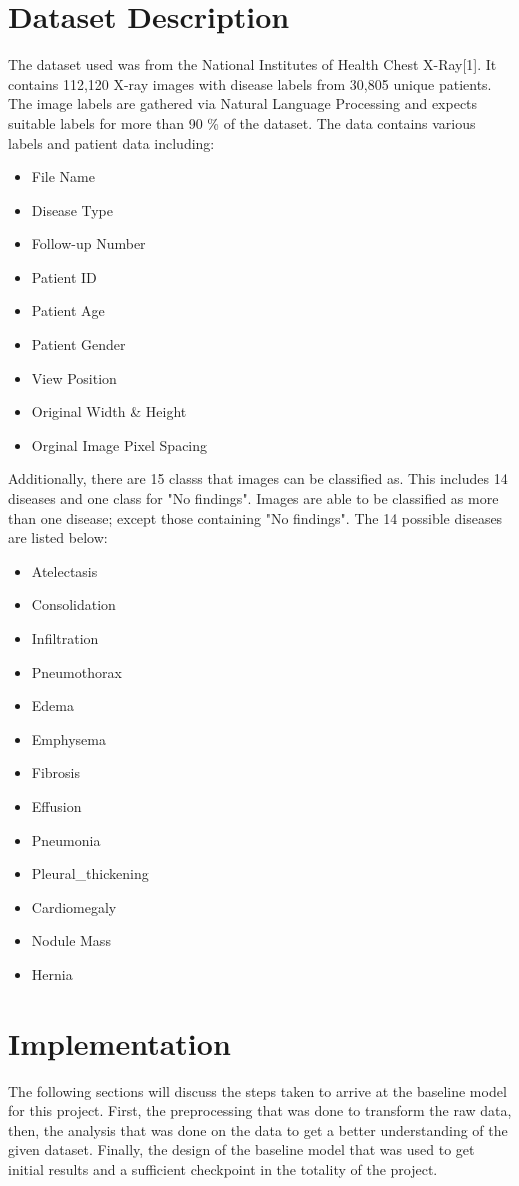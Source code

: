 \documentclass{article}
\begin{document}
\section{Dataset Description}
The dataset used was from the National Institutes of Health Chest X-Ray[1]. It contains 112,120 X-ray images with disease labels from 30,805 unique patients. The image labels are gathered via Natural Language Processing and expects suitable labels for more than 90 \% of the dataset. The data contains various labels and patient data including:
\begin{itemize}
    \item File Name
    \item Disease Type
    \item Follow-up Number
    \item Patient ID
    \item Patient Age
    \item Patient Gender
    \item View Position
    \item Original Width \& Height
    \item Orginal Image Pixel Spacing
\end{itemize}

Additionally, there are 15 classs that images can be classified as. This includes 14 diseases and one class for "No findings". Images are able to be classified as more than one disease; except those containing "No findings". The 14 possible diseases are listed below:
\begin{itemize}
    \item Atelectasis
    \item Consolidation
    \item Infiltration
    \item Pneumothorax
    \item Edema
    \item Emphysema
    \item Fibrosis
    \item Effusion
    \item Pneumonia
    \item Pleural\_thickening
    \item Cardiomegaly
    \item Nodule Mass
    \item Hernia
\end{itemize}

\section{Implementation}
The following sections will discuss the steps taken to arrive at the baseline model for this project. First, the preprocessing that was done to transform the raw data, then, the analysis that was done on the data to get a better understanding of the given dataset. Finally, the design of the baseline model that was used to get initial results and a sufficient checkpoint in the totality of the project.
\end{document}
